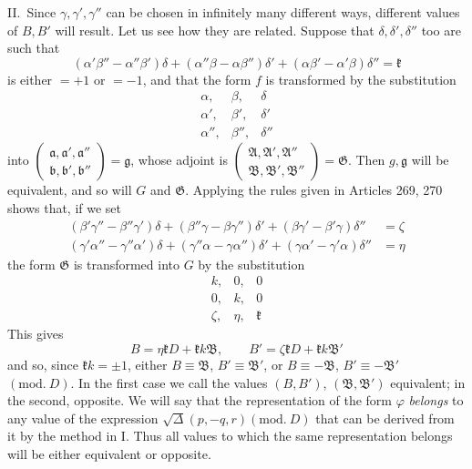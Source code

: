 II.\ Since $\gamma,\gamma',\gamma''$ can be chosen in infinitely many different ways,
different values of $B,B'$ will result. Let us see how they are related.
Suppose that $\delta,\delta',\delta''$ too are such that
\[
(\alpha'\beta''-\alpha''\beta')\delta+
(\alpha''\beta-\alpha\beta'')\delta'+
(\alpha\beta'-\alpha'\beta)\delta''=\mathfrak{k}
\]
is either $=+1$ or $=-1$, and that the form $f$ is transformed
by the substitution
\[
\begin{array}{ccc}
\alpha,&\beta,&\delta\\
\alpha',&\beta',&\delta'\\
\alpha'',&\beta'',&\delta''
\end{array}
\]
into
$\left(\begin{smallmatrix}\mathfrak{a},\mathfrak{a}',\mathfrak{a}''\\\mathfrak{b},\mathfrak{b}',\mathfrak{b}''\end{smallmatrix}\right)=\mathfrak{g}$,
whose adjoint is
$\left(\begin{smallmatrix}\mathfrak{A},\mathfrak{A}',\mathfrak{A}''\\\mathfrak{B},\mathfrak{B}',\mathfrak{B}''\end{smallmatrix}\right)=\mathfrak{G}$.
Then $g,\mathfrak{g}$ will be equivalent, and so will $G$ and $\mathfrak{G}$.
Applying the rules given in Articles 269, 270
shows that, if we set
\[
\begin{aligned}
(\beta'\gamma''-\beta''\gamma')\delta+
(\beta''\gamma-\beta\gamma'')\delta'+
(\beta\gamma'-\beta'\gamma)\delta''&=\zeta\\
(\gamma'\alpha''-\gamma''\alpha')\delta+
(\gamma''\alpha-\gamma\alpha'')\delta'+
(\gamma\alpha'-\gamma'\alpha)\delta''&=\eta
\end{aligned}
\]
the form $\mathfrak{G}$ is transformed into $G$ by the substitution
\[
\begin{array}{ccc}
k,&0,&0\\
0,&k,&0\\
\zeta,&\eta,&\mathfrak{k}
\end{array}
\]
This gives
\[
B=\eta\mathfrak{k}D+\mathfrak{k}k\mathfrak{B},\qquad
B'=\zeta\mathfrak{k}D+\mathfrak{k}k\mathfrak{B}'
\]
and so, since $\mathfrak{k}k=\pm1$, either $B\equiv\mathfrak{B}$, $B'\equiv\mathfrak{B}'$, or $B\equiv-\mathfrak{B}$, $B'\equiv-\mathfrak{B}'$
$(\mathrm{mod.}\ D)$. In the first case we call the values $(B,B')$, $(\mathfrak{B},\mathfrak{B}')$ equivalent;
in the second, opposite. We will say that the representation of the form
$\varphi$ \textit{belongs} to any value of the
expression $\surd\Delta(p,\allowbreak -q,\allowbreak r)(\mathrm{mod.}\ D)$ that can be derived from it by the method in I.
Thus all values to which the same representation belongs will be either
equivalent or opposite.

